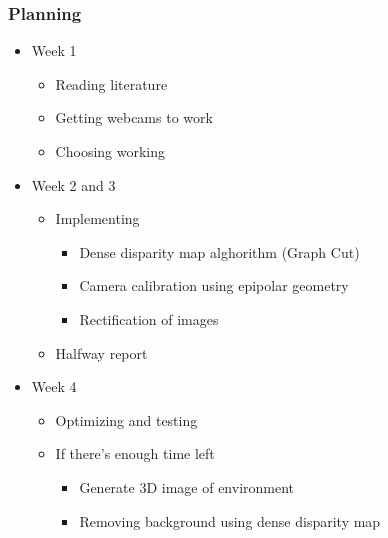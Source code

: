 \documentclass{beamer}
\begin{document}
\frame
{
  \frametitle{Planning}
  \begin{itemize}
    \item Week 1
      \begin{itemize}
        \item Reading literature
        \item Getting webcams to work
        \item Choosing working
      \end{itemize}
    \item Week 2 and 3
      \begin{itemize}
        \item Implementing
          \begin{itemize}
            \item Dense disparity map alghorithm (Graph Cut)
            \item Camera calibration using epipolar geometry
            \item Rectification of images
          \end{itemize}
        \item Halfway report
      \end{itemize}
    \item Week 4
      \begin{itemize}
        \item Optimizing and testing
        \item If there's enough time left
          \begin{itemize}
            \item Generate 3D image of environment
            \item Removing background using dense disparity map
          \end{itemize}
      \end{itemize}
  \end{itemize}
}
\end{document}
